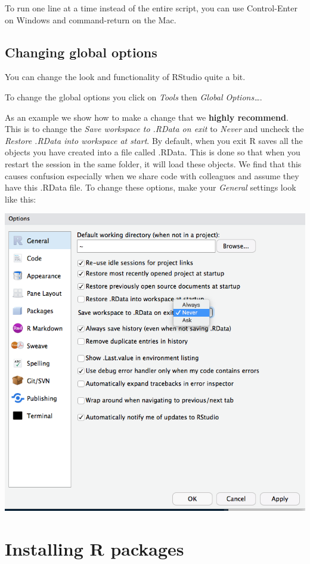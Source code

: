 \documentclass[
]{krantz}
\begin{document}
To run one line at a time instead of the entire script, you can use Control-Enter on Windows and command-return on the Mac.

\hypertarget{changing-global-options}{%
\subsection{Changing global options}\label{changing-global-options}}

You can change the look and functionality of RStudio quite a bit.

To change the global options you click on \emph{Tools} then \emph{Global Options\ldots{}}.

As an example we show how to make a change that we \textbf{highly recommend}. This is to change the \emph{Save workspace to .RData on exit} to \emph{Never} and uncheck the \emph{Restore .RData into workspace at start}. By default, when you exit R saves all the objects you have created into a file called .RData. This is done so that when you restart the session in the same folder, it will load these objects. We find that this causes confusion especially when we share code with colleagues and assume they have this .RData file. To change these options, make your \emph{General} settings look like this:

\begin{center}\includegraphics[width=0.7\linewidth]{productivity/img/windows-screenshots/VirtualBox_Windows-7-Enterprise_22_03_2018_16_56_08} \end{center}

\hypertarget{installing-r-packages}{%
\section{Installing R packages}\label{installing-r-packages}}
\end{document}
